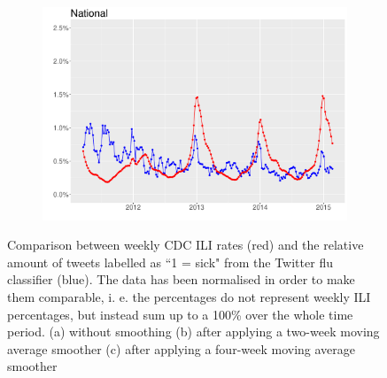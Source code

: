 \documentclass[11pt, a4paper]{report}\usepackage[]{graphicx}\usepackage[]{color}
\begin{document}
\begin{figure}[H]
  \begin{subfigure}[t]{0.6\textwidth}
  \includegraphics[width=1\linewidth,height=0.5\linewidth]{cdc_twitter_comp_nat_ma4.pdf}
  \caption{}
  \label{fig:cdc_tw_comp_nat_ma4}
  \end{subfigure}
  \caption{Comparison between weekly CDC ILI rates (red) and the relative amount of tweets labelled as ``1 = sick" from the Twitter flu classifier (blue). The data has been normalised in order to make them comparable, i. e. the percentages do not represent weekly ILI percentages, but instead sum up to a 100\% over the whole time period. (a) without smoothing (b) after applying a two-week moving average smoother (c) after applying a four-week moving average smoother}
\end{figure}
\end{document}
